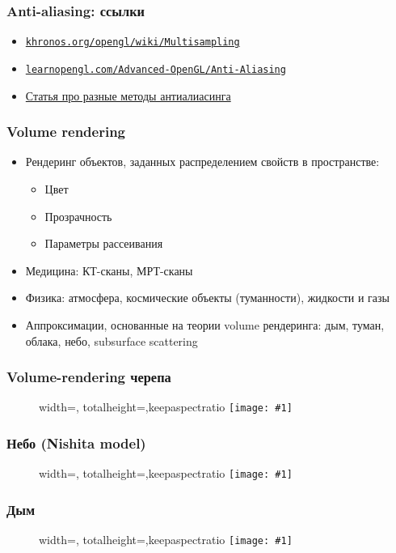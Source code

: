 \documentclass{beamer}
\newcommand{\slideimage}[1]{
  \begin{figure}
    \begin{adjustbox}{width=\textwidth, totalheight=\textheight-2\baselineskip-2\baselineskip,keepaspectratio}
      \texttt{[image: \#1]}
    \end{adjustbox}
  \end{figure}
}
\begin{document}
\begin{frame}[fragile]
\frametitle{Anti-aliasing: ссылки}
\begin{itemize}
\item \href{https://www.khronos.org/opengl/wiki/Multisampling}{\nolinkurl{khronos.org/opengl/wiki/Multisampling}}
\item \href{https://learnopengl.com/Advanced-OpenGL/Anti-Aliasing}{\nolinkurl{learnopengl.com/Advanced-OpenGL/Anti-Aliasing}}
\item \href{https://www.digitaltrends.com/computing/what-is-anti-aliasing}{Статья про разные методы антиалиасинга}
\end{itemize}
\end{frame}

\begin{frame}[fragile]
\frametitle{Volume rendering}
\begin{itemize}
\item Рендеринг объектов, заданных распределением свойств в пространстве:
\pause
\begin{itemize}
\item Цвет
\item Прозрачность
\item Параметры рассеивания
\end{itemize}
\pause
\item Медицина: КТ-сканы, МРТ-сканы
\item Физика: атмосфера, космические объекты (туманности), жидкости и газы
\item Аппроксимации, основанные на теории volume рендеринга: дым, туман, облака, небо, subsurface scattering
\end{itemize}
\end{frame}

\begin{frame}[fragile]
\frametitle{Volume-rendering черепа}
\slideimage{volume-skull.png}
\end{frame}

\begin{frame}[fragile]
\frametitle{Небо (Nishita model)}
\slideimage{sky.jpg}
\end{frame}

\begin{frame}[fragile]
\frametitle{Дым}
\slideimage{smoke.png}
\end{frame}
\end{document}

